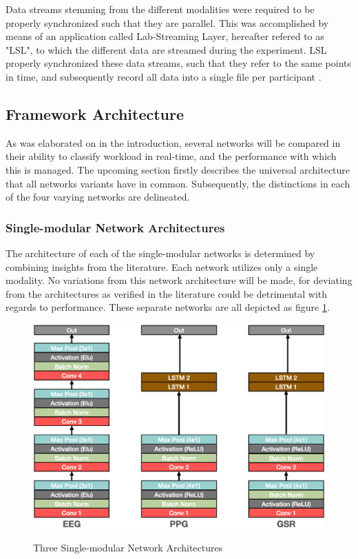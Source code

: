 \documentclass[12pt]{article}
\begin{document}
Data streams stemming from the different modalities were required to be properly synchronized such that they are parallel. This was accomplished by means of an application called Lab-Streaming Layer, hereafter refered to as "LSL", to which the different data are streamed during the experiment. LSL properly synchronized these data streams, such that they refer to the same points in time, and subsequently record all data into a single file per participant \cite{kothe2018lab}.

\subsection{Framework Architecture}
As was elaborated on in the introduction, several networks will be compared in their ability to classify workload in real-time, and the performance with which this is managed. The upcoming section firstly describes the universal architecture that all networks variants have in common. Subsequently, the distinctions in each of the four varying networks are delineated. 

\subsubsection{Single-modular Network Architectures}
The architecture of each of the single-modular networks is determined by combining insights from the literature. Each network utilizes only a single modality. No variations from this network architecture will be made, for deviating from the architectures as verified in the literature could be detrimental with regards to performance. These separate networks are all depicted as figure \ref{fig:singlearchitecture}.

\begin{figure}
\caption{Three Single-modular Network Architectures}
\bigskip
\includegraphics[scale=0.725]{single_model_architecture}
\label{fig:singlearchitecture}
\end{figure}
\end{document}
